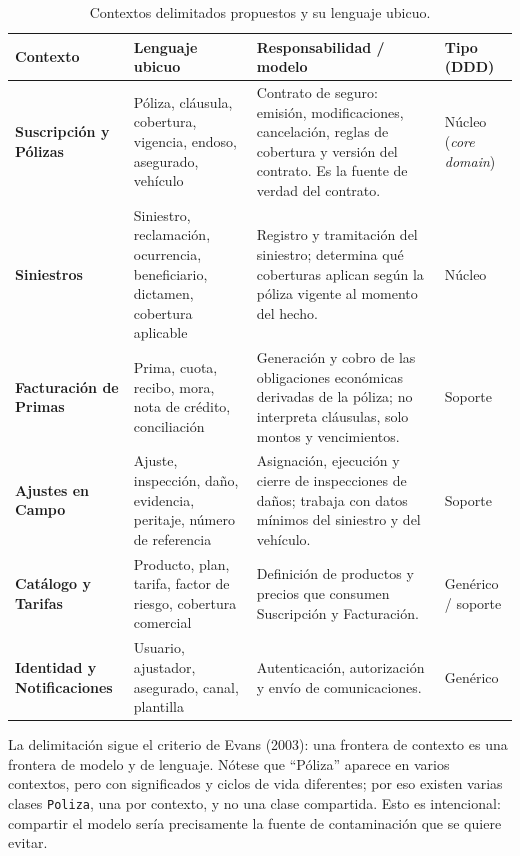 \documentclass[11pt,a4paper]{article}
\begin{document}
\begin{table}[h]
\centering
\footnotesize
\setlength{\tabcolsep}{4pt}
\renewcommand{\arraystretch}{1.25}
\begin{tabular}{@{}p{2.7cm}p{3.9cm}p{5.1cm}p{2.9cm}@{}}
\toprule
\textbf{Contexto} & \textbf{Lenguaje ubicuo} & \textbf{Responsabilidad / modelo} & \textbf{Tipo (DDD)} \\
\midrule
\textbf{Suscripción y Pólizas} &
Póliza, cláusula, cobertura, vigencia, endoso, asegurado, vehículo &
Contrato de seguro: emisión, modificaciones, cancelación, reglas de cobertura y versión del contrato. Es la fuente de verdad del contrato. &
Núcleo (\emph{core domain}) \\
\addlinespace
\textbf{Siniestros} &
Siniestro, reclamación, ocurrencia, beneficiario, dictamen, cobertura aplicable &
Registro y tramitación del siniestro; determina qué coberturas aplican según la póliza vigente al momento del hecho. &
Núcleo \\
\addlinespace
\textbf{Facturación de Primas} &
Prima, cuota, recibo, mora, nota de crédito, conciliación &
Generación y cobro de las obligaciones económicas derivadas de la póliza; no interpreta cláusulas, solo montos y vencimientos. &
Soporte \\
\addlinespace
\textbf{Ajustes en Campo} &
Ajuste, inspección, daño, evidencia, peritaje, número de referencia &
Asignación, ejecución y cierre de inspecciones de daños; trabaja con datos mínimos del siniestro y del vehículo. &
Soporte \\
\addlinespace
\textbf{Catálogo y Tarifas} &
Producto, plan, tarifa, factor de riesgo, cobertura comercial &
Definición de productos y precios que consumen Suscripción y Facturación. &
Genérico / soporte \\
\addlinespace
\textbf{Identidad y Notificaciones} &
Usuario, ajustador, asegurado, canal, plantilla &
Autenticación, autorización y envío de comunicaciones. &
Genérico \\
\bottomrule
\end{tabular}
\caption{Contextos delimitados propuestos y su lenguaje ubicuo.}
\end{table}

La delimitación sigue el criterio de Evans (2003): una frontera de contexto es una frontera
de modelo y de lenguaje. Nótese que ``Póliza'' aparece en varios contextos, pero con
significados y ciclos de vida diferentes; por eso existen varias clases \texttt{Poliza},
una por contexto, y no una clase compartida. Esto es intencional: compartir el modelo
sería precisamente la fuente de contaminación que se quiere evitar.
\end{document}
